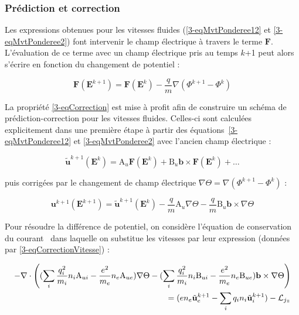 \begin{refsection}
\subsubsection{Prédiction et correction}

Les expressions obtenues pour les vitesses
fluides (\eqref{3-eqMvtPonderee12} et \eqref{3-eqMvtPonderee2}) font intervenir
le champ électrique à travers le terme $\mathbf F$.
L'évaluation de ce terme avec un champ électrique pris au temps $k$+1 peut alors
s'écrire en fonction du changement de potentiel :

\begin{equation}
\label{3-eqCorrection}
\mathbf F(\mathbf E^{k+1}) = \mathbf F(\mathbf E^{k})-\frac{q}{m}\nabla
(\Phi^{k+1}-\Phi^{k})
\end{equation}

La propriété \eqref{3-eqCorrection} est mise à profit afin de construire un
schéma de prédiction-correction pour les vitesses fluides. Celles-ci sont
calculées explicitement dans une première étape à partir des
équations~\eqref{3-eqMvtPonderee12} et \eqref{3-eqMvtPonderee2} avec 
l'ancien champ électrique :

\begin{equation}
\tilde{\mathbf u}^{k+1}(\mathbf{E}^k)=\text{A}_u\mathbf F(\mathbf E^{k}) +
\text{B}_u\mathbf b\times\mathbf F(\mathbf E^{k}) + \text{\ldots}
\end{equation}

puis corrigées par le changement de champ électrique
$\nabla\Theta=\nabla(\Phi^{k+1}-\Phi^k)$ :

\begin{equation}
\label{3-eqCorrectionVitesse}
\mathbf u^{k+1}(\mathbf{E}^{k+1}) = \tilde{\mathbf
u}^{k+1}(\mathbf{E}^k)-\frac{q}{m}\text{A}_u\nabla
\Theta-\frac{q}{m}\text{B}_u\mathbf b\times\nabla
\Theta
\end{equation}

Pour résoudre la différence de potentiel, on considère l'équation de
conservation du courant~ dans laquelle on substitue les
vitesses par leur expression (données par \eqref{3-eqCorrectionVitesse}) :

\begin{equation}
\begin{split}
\label{3-eqCourantCoefficient}
-\nabla\cdot\left((\sum_i\frac{q_i^2}{m_i}n_i\text{A}_{ui}-\frac{e^2}{m_e}n_e\text{A}_{ue})\nabla
\Theta-(\sum_i\frac{q_i^2}{m_i}n_i\text{B}_{ui}-\frac{e^2}{m_e}n_e\text{B}_{ue})\mathbf
b\times\nabla
\Theta\right)\\=(en_e\tilde{\mathbf
u}_e^{k+1}-\sum_iq_in_i\tilde{\mathbf u}_i^{k+1})-\mathcal L_{j_\para}
\end{split}
\end{equation}


\end{refsection}
